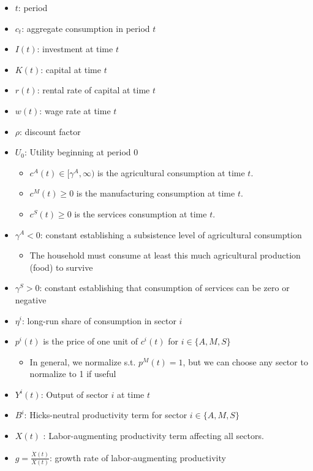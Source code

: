 \documentclass[10pt]{article}
\begin{document}
\begin{itemize}
    \item $t$: period
    \item $c_t$: aggregate consumption in period $t$
    \item $I(t)$: investment at time $t$
    \item $K(t)$: capital at time $t$
    \item $r(t)$: rental rate of capital at time $t$
    \item $w(t)$: wage rate at time $t$
    \item $\rho$: discount factor
    \item $U_0$: Utility beginning at period 0
    \begin{itemize}
        \item $c^A(t) \in [\gamma^A, \infty)$ is the agricultural consumption at time $t$.
        \item $c^M(t) \geq 0$ is the manufacturing consumption at time $t$.
        \item $c^S(t) \geq 0$ is the services consumption at time $t$.
    \end{itemize}
    \item $\gamma^A < 0$: constant establishing a subsistence level of agricultural consumption
    \begin{itemize}
        \item The household must consume at least this much agricultural production (food) to survive
    \end{itemize}
    \item $\gamma^S >0$: constant establishing that consumption of services can be zero or negative
    \item $\eta^i$: long-run share of consumption in sector $i$
    \item $p^i(t)$ is the price of one unit of $c^i(t)$ for $i \in\{A, M, S\}$
    \begin{itemize}
        \item In general, we normalize s.t. $p^M(t)=1$, but we can choose any sector to normalize to 1 if useful
    \end{itemize}
    \item $Y^i(t)$: Output of sector $i$ at time $t$
    \item $B^i$: Hicks-neutral productivity term for sector $i \in\{A, M, S\}$
    \item $X(t)$ : Labor-augmenting productivity term affecting all sectors.
    \item $g = \frac{\dot{X}(t)}{X(t)}$: growth rate of labor-augmenting productivity
\end{itemize}
\end{document}
